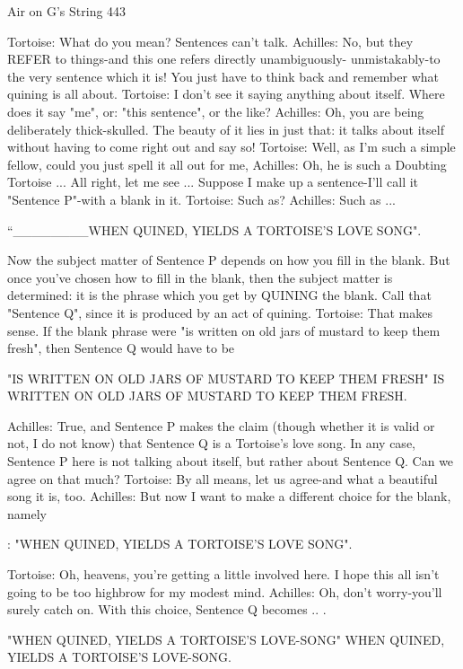 Air on G's String                                                                      443

  Tortoise: What do you mean? Sentences can't talk.
  Achilles: No, but they REFER to things-and this one refers directly unambiguously-
    unmistakably-to the very sentence which it is! You just have to think back and
    remember what quining is all about.
  Tortoise: I don't see it saying anything about itself. Where does it say "me", or: "this
    sentence", or the like?
  Achilles: Oh, you are being deliberately thick-skulled. The beauty of it lies in just that:
    it talks about itself without having to come right out and say so!
  Tortoise: Well, as I'm such a simple fellow, could you just spell it all out for me,
  Achilles: Oh, he is such a Doubting Tortoise ... All right, let me see ... Suppose I make
    up a sentence-I'll call it "Sentence P"-with a blank in it.
  Tortoise: Such as?
  Achilles: Such as ...

     “\_\_\_\_\_\_\_\_WHEN QUINED, YIELDS A TORTOISE'S LOVE SONG".

    Now the subject matter of Sentence P depends on how you fill in the blank. But
    once you've chosen how to fill in the blank, then the subject matter is determined: it
    is the phrase which you get by QUINING the blank. Call that "Sentence Q", since it
    is produced by an act of quining.
  Tortoise: That makes sense. If the blank phrase were "is written on old jars of mustard
    to keep them fresh", then Sentence Q would have to be

     "IS WRITTEN ON OLD JARS OF MUSTARD TO KEEP THEM FRESH"
     IS WRITTEN ON OLD JARS OF MUSTARD TO KEEP THEM FRESH.

  Achilles: True, and Sentence P makes the claim (though whether it is valid or not, I do
    not know) that Sentence Q is a Tortoise's love song. In any case, Sentence P here is
    not talking about itself, but rather about Sentence Q. Can we agree on that much?
  Tortoise: By all means, let us agree-and what a beautiful song it is, too.
  Achilles: But now I want to make a different choice for the blank, namely

     : "WHEN QUINED, YIELDS A TORTOISE'S LOVE SONG".

  Tortoise: Oh, heavens, you're getting a little involved here. I hope this all isn't going to
    be too highbrow for my modest mind.
  Achilles: Oh, don't worry-you'll surely catch on. With this choice, Sentence Q
    becomes .. .

     "WHEN QUINED, YIELDS A TORTOISE'S LOVE-SONG"
     WHEN QUINED, YIELDS A TORTOISE'S LOVE-SONG.

